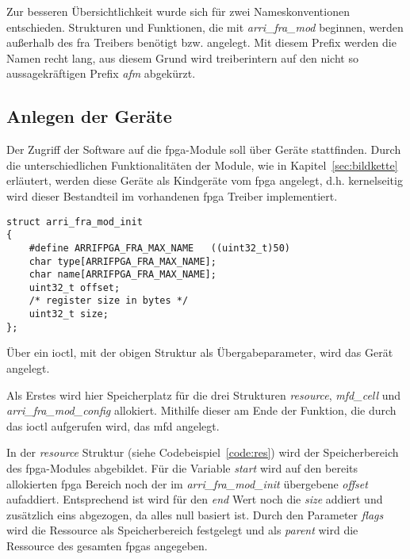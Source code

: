 Zur besseren Übersichtlichkeit wurde sich für zwei Nameskonventionen entschieden. Strukturen und Funktionen, die mit \textit{arri\_fra\_mod} beginnen, werden außerhalb des \ac{fra} Treibers benötigt bzw. angelegt. Mit diesem Prefix werden die Namen recht lang, aus diesem Grund wird treiberintern auf den nicht so aussagekräftigen Prefix \textit{afm} abgekürzt.




\subsection{Anlegen der Geräte}
Der Zugriff der Software auf die \ac{fpga}-Module soll über Geräte stattfinden. Durch die unterschiedlichen Funktionalitäten der Module, wie in Kapitel~\ref{sec:bildkette} erläutert, werden diese Geräte als Kindgeräte vom \ac{fpga} angelegt, d.h. kernelseitig wird dieser Bestandteil im vorhandenen \ac{fpga} Treiber implementiert. 

\begin{lstlisting}
struct arri_fra_mod_init 
{
	#define ARRIFPGA_FRA_MAX_NAME   ((uint32_t)50)
	char type[ARRIFPGA_FRA_MAX_NAME];
	char name[ARRIFPGA_FRA_MAX_NAME];
	uint32_t offset;
	/* register size in bytes */
	uint32_t size;
};
\end{lstlisting}

Über ein \ac{ioctl}, mit der obigen Struktur als Übergabeparameter, wird das Gerät angelegt. 


Als Erstes wird hier Speicherplatz für die drei Strukturen \textit{resource}, \textit{mfd\_cell} und \textit{arri\_fra\_mod\_config} allokiert. Mithilfe dieser am Ende der Funktion, die durch das \ac{ioctl} aufgerufen wird, das \ac{mfd} angelegt.


In der \textit{resource} Struktur (siehe Codebeispiel~\ref{code:res}) wird der Speicherbereich des \ac{fpga}-Modules abgebildet. Für die Variable \textit{start} wird auf den bereits allokierten \ac{fpga} Bereich noch der im \textit{arri\_fra\_mod\_init} übergebene \textit{offset} aufaddiert. Entsprechend ist wird für den \textit{end} Wert noch die \textit{size} addiert und zusätzlich eins abgezogen, da alles null basiert ist. Durch den Parameter \textit{flags} wird die Ressource als Speicherbereich festgelegt und als \textit{parent} wird die Ressource des gesamten \ac{fpga}s angegeben.


